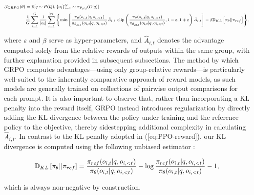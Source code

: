\begin{itemize}[topsep=0pt]
\begin{itemize}[topsep=0pt]
\begin{equation}
\footnotesize
\begin{split}
    \mathcal{J}_{GRPO}(\theta) &= \mathbb{E}{[q \sim P(Q), \{o_i\}_{i=1}^G \sim \pi_{\theta_{old}}(O|q)]}  \\
    & \frac{1}{G}\sum_{i=1}^G\frac{1}{|o_i|} \sum_{t=1}^{|o_i|} \left\{ \min \left[ \frac{\pi_\theta(o_{i,t} | q, o_{i,<t})}{\pi_{\theta_{old}}(o_{i,t} | q, o_{i,<t})} \hat{A}_{i,t}, \text{clip} \left( \frac{\pi_\theta(o_{i,t} | q, o_{i,<t})}{\pi_{\theta_{old}}(o_{i,t} | q, o_{i,<t})}, 1 - \varepsilon, 1 + \varepsilon \right)  \hat{A}_{i,t} \right] - \beta \mathbb{D}_{KL}\left[\pi_{\theta} || \pi_{ref}\right]\right\} ,
\end{split}
\label{eq:GRPO-obj}
\end{equation}

where $\varepsilon$ and $\beta$ serve as hyper-parameters, and $\hat{A}_{i,t}$ denotes the advantage computed solely from the relative rewards of outputs within the same group, with further explanation provided in subsequent subsections. The method by which GRPO computes advantages—using only group-relative rewards—is particularly well-suited to the inherently comparative approach of reward models, as such models are generally trained on collections of pairwise output comparisons for each prompt. It is also important to observe that, rather than incorporating a KL penalty into the reward itself, GRPO instead introduces regularization by directly adding the KL divergence between the policy under training and the reference policy to the objective, thereby sidestepping additional complexity in calculating $\hat{A}_{i,t}$. In contrast to the KL penalty adopted in (\ref{eq:PPO-reward}), our KL divergence is computed using the following unbiased estimator \citep{kl_approx}:

\begin{equation}
\small
    \mathbb{D}_{KL}\left[\pi_{\theta} || \pi_{ref}\right] = \frac{\pi_{ref}(o_{i,t}|q,o_{i,<t})}{\pi_{\theta}(o_{i,t}|q,o_{i,<t})}- \log\frac{\pi_{ref}(o_{i,t}|q,o_{i,<t})}{\pi_{\theta}(o_{i,t}|q,o_{i,<t})} - 1,
\end{equation}

which is always non-negative by construction.


\end{itemize}
\end{itemize}
